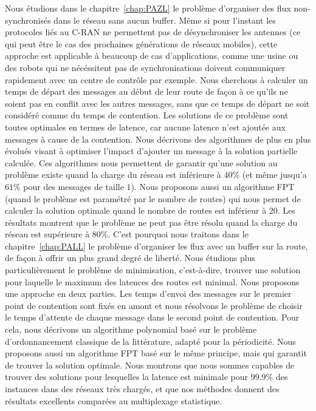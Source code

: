Nous étudions dans le chapitre~\ref{chap:PAZL} le problème d'organiser des flux non-synchronisés dans le réseau sans aucun buffer.
Même si pour l'instant les protocoles liés au C-RAN ne permettent pas de désynchroniser les antennes (ce qui peut être le cas des prochaines générations de réseaux mobiles), cette approche est applicable à beaucoup de cas d'applications, comme une usine ou des robots qui ne nécéssitent pas de synchronisations doivent communiquer rapidement avec un centre de contrôle par exemple.
Nous cherchons à calculer un temps de départ des messages au début de leur route de façon à ce qu'ils ne soient pas en conflit avec les autres messages, sans que ce temps de départ ne soit considéré comme du temps de contention.
Les solutions de ce problème sont toutes optimales en termes de latence, car aucune latence n'est ajoutée aux messages à cause de la contention. Nous décrivons des algorithmes de plus en plus évolués visant à optimiser l'impact d'ajouter un message à la solution partielle calculée. Ces algorithmes nous permettent de garantir qu'une solution au problème existe quand la charge du réseau est inférieure à $40\%$ (et même jusqu'a $61\%$ pour des messages de taille $1$). Nous proposons aussi un algorithme FPT (quand le problème est paramétré par le nombre de routes) qui nous permet de calculer la solution optimale quand le nombre de routes est inférieur à $20$. Les résultats montrent que le problème ne peut pas être résolu quand la charge du réseau est supérieure à $80\%$.
C'est pourquoi nous traitons dans le chapitre~\ref{chap:PALL} le problème d'organiser les flux avec un buffer sur la route, de façon à offrir un plus grand degré de liberté. Nous étudions plus particulièrement le problème de minimisation, c'est-à-dire, trouver une solution pour laquelle le maximum des latences des routes est minimal. Nous proposons une approche en deux parties. Les temps d'envoi des messages sur le premier point de contention sont fixés en amont et nous résolvons le problème de choisir le temps d'attente de chaque message dans le second point de contention. Pour cela, nous décrivons un algorithme polynomial basé sur le problème d'ordonnancement classique de la littérature, adapté pour la périodicité. Nous proposons aussi un algorithme FPT basé sur le même principe, mais qui garantit de trouver la solution optimale. Nous montrons que nous sommes capables de trouver des solutions pour lesquelles la latence est minimale pour $99.9\%$ des instances dans des réseaux très chargés, et que nos méthodes donnent des résultats excellents comparées au multiplexage statistique.

